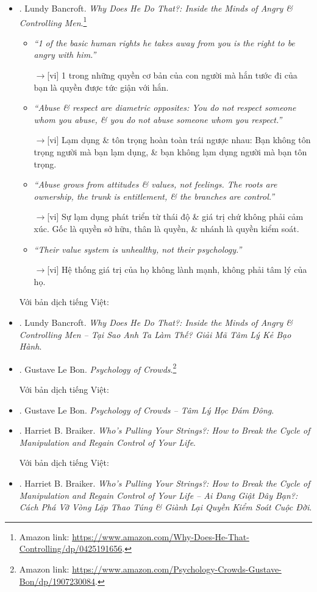 \documentclass[12pt,oneside]{book}
\begin{document}
\begin{itemize}
	\item \cite{Bancroft_why_he_do}. {\sc Lundy Bancroft}. {\it Why Does He Do That?: Inside the Minds of Angry \& Controlling Men}.\footnote{Amazon link: \url{https://www.amazon.com/Why-Does-He-That-Controlling/dp/0425191656}.}
	\begin{itemize}
		\item {\it``1 of the basic human rights he takes away from you is the right to be angry with him.''}
		
		{\sf[en]$\to$[vi]} 1 trong những quyền cơ bản của con người mà hắn tước đi của bạn là quyền được tức giận với hắn.
		
		\item {\it``Abuse \& respect are diametric opposites: You do not respect someone whom you abuse, \& you do not abuse someone whom you respect.''}
		
		{\sf[en]$\to$[vi]} Lạm dụng \& tôn trọng hoàn toàn trái ngược nhau: Bạn không tôn trọng người mà bạn lạm dụng, \& bạn không lạm dụng người mà bạn tôn trọng.
		
		\item {\it``Abuse grows from attitudes \& values, not feelings. The roots are ownership, the trunk is entitlement, \& the branches are control.''}
			
		{\sf[en]$\to$[vi]} Sự lạm dụng phát triển từ thái độ \& giá trị chứ không phải cảm xúc. Gốc là quyền sở hữu, thân là quyền, \& nhánh là quyền kiểm soát.
		
		\item {\it``Their value system is unhealthy, not their psychology.''}
		
		{\sf[en]$\to$[vi]} Hệ thống giá trị của họ không lành mạnh, không phải tâm lý của họ.
	\end{itemize}
	Với bản dịch tiếng Việt:
	\item \cite{Bancroft_why_he_do_VN}. {\sc Lundy Bancroft}. {\it Why Does He Do That?: Inside the Minds of Angry \& Controlling Men -- Tại Sao Anh Ta Làm Thế? Giải Mã Tâm Lý Kẻ Bạo Hành}.
	\item \cite{Bon_crowd_psychology}. {\sc Gustave Le Bon}. {\it Psychology of Crowds}.\footnote{Amazon link: \url{https://www.amazon.com/Psychology-Crowds-Gustave-Bon/dp/1907230084}.}
	
	Với bản dịch tiếng Việt:
	\item \cite{Bon_crowd_psychology_VN}. {\sc Gustave Le Bon}. {\it Psychology of Crowds -- Tâm Lý Học Đám Đông}.
	\item \cite{Braiker_string}. {\sc Harriet B. Braiker}. {\it Who's Pulling Your Strings?: How to Break the Cycle of Manipulation and Regain Control of Your Life}.
	
	Với bản dịch tiếng Việt:
	\item \cite{Braiker_string}. {\sc Harriet B. Braiker}. {\it Who's Pulling Your Strings?: How to Break the Cycle of Manipulation and Regain Control of Your Life -- Ai Đang Giật Dây Bạn?: Cách Phá Vỡ Vòng Lặp Thao Túng \& Giành Lại Quyền Kiểm Soát Cuộc Đời}.
\end{itemize}
\end{document}
